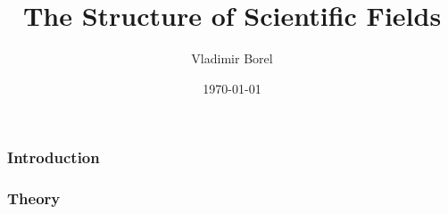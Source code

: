 \documentclass[xcolor=dvipsnames]{beamer}
\title{The Structure of Scientific Fields}
\author{Vladimir Borel}
\institute{University of California, Riverside}
\date{\today}
\begin{document}
\frame{\titlepage}

\begin{frame}
\frametitle{Introduction}

\end{frame}

\begin{frame}
\frametitle{Theory}

\end{frame}

% 

% 

% 







\end{document}
